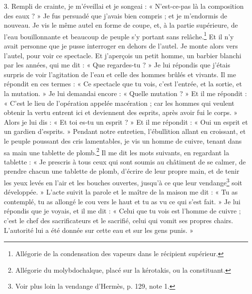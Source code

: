 \documentclass[landscape, a4paper, 11pt, oneside, polutonikogreek, french]{article}
\begin{document}
3. Rempli de crainte, je m'éveillai et je songeai : « N'est-ce-pas là la composition des eaux ? » Je fus persuadé que j'avais bien compris ; et je m'endormis de nouveau. Je vis le même autel en forme de coupe, et, à la partie supérieure, de l'eau bouillonnante et beaucoup de peuple s'y portant sans relâche.\footnote{Allégorie de la condensation des vapeurs dans le récipient supérieur.} Et il n'y avait personne que je pusse interroger en dehors de l'autel. Je monte alors vers l'autel, pour voir ce spectacle. Et j'aperçois un petit homme, un barbier blanchi par les années, qui me dit : « Que regardes-tu ? » Je lui répondis que j'étais surpris de voir l'agitation de l'eau et celle des hommes brûlés et vivants. Il me répondit en ces termes : « Ce spectacle que tu vois, c'est l'entrée, et la sortie, et la mutation. » Je lui demandai encore : « Quelle mutation ? » Et il me répondit : « C'est le lieu de l'opération appelée macération ; car les hommes qui veulent obtenir la vertu entrent ici et deviennent des esprits, après avoir fui le corps. » Alors je lui dis : « Et toi es-tu un esprit ? » Et il me répondit : « Oui un esprit et un gardien d'esprits. » Pendant notre entretien, l'ébullition allant en croissant, et le peuple poussant des cris lamentables, je vis un homme de cuivre, tenant dans sa main une tablette de plomb.\footnote{Allégorie du molybdochalque, placé sur la kérotakis, ou la constituant.} Il me dit les mots suivants, en regardant la tablette : « Je prescris à tous ceux qui sont soumis au châtiment de se calmer, de prendre chacun une tablette de plomb, d'écrire de leur propre main, et de tenir les yeux levés en l'air et les bouches ouvertes, jusqu'à ce que leur vendange\footnote{Voir plus loin la vendange d'Hermès, p. 129, note 1.} soit développée. » L'acte suivit la parole et le maître de la maison me dit : « Tu as contemplé, tu as allongé le cou vers le haut et tu as vu ce qui s'est fait. » Je lui répondis que je voyais, et il me dit : « Celui que tu vois est l'homme de cuivre ; c'est le chef des sacrificateurs et le sacrifié, celui qui vomit ses propres chairs. L'autorité lui a été donnée sur cette eau et sur les gens punis. »
\end{document}
